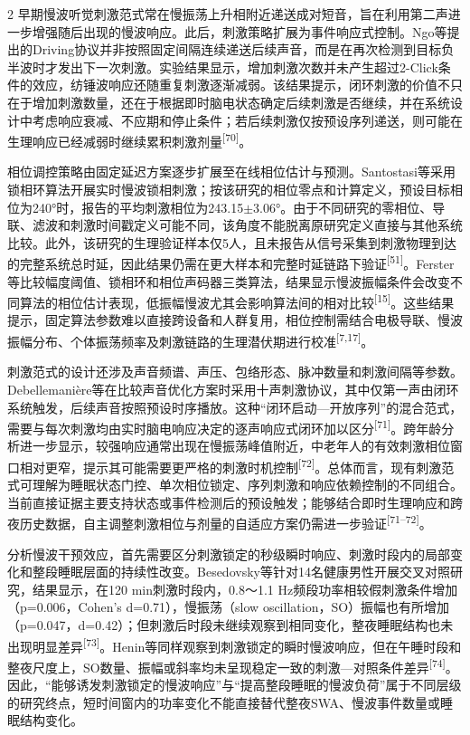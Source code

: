 \documentclass[UTF8,zihao=5,fontset=none]{ctexart}
\newcommand{\hei}{\CJKfamily{hei}}
\newcommand{\leveltwo}[1]{%
  \par\noindent{\hei\fontsize{10pt}{12pt}\selectfont\bfseries #1\par}}
\newcommand{\refcite}[1]{\nolinebreak[4]\textsuperscript{[#1]}}
\begin{document}
\begin{multicols}{2}
早期慢波听觉刺激范式常在慢振荡上升相附近递送成对短音，旨在利用第二声进一步增强随后出现的慢波响应。此后，刺激策略扩展为事件响应式控制。Ngo等提出的Driving协议并非按照固定间隔连续递送后续声音，而是在再次检测到目标负半波时才发出下一次刺激。实验结果显示，增加刺激次数并未产生超过2-Click条件的效应，纺锤波响应还随重复刺激逐渐减弱。该结果提示，闭环刺激的价值不只在于增加刺激数量，还在于根据即时脑电状态确定后续刺激是否继续，并在系统设计中考虑响应衰减、不应期和停止条件；若后续刺激仅按预设序列递送，则可能在生理响应已经减弱时继续累积刺激剂量\refcite{70}。\par

相位调控策略由固定延迟方案逐步扩展至在线相位估计与预测。Santostasi等采用锁相环算法开展实时慢波锁相刺激；按该研究的相位零点和计算定义，预设目标相位为240°时，报告的平均刺激相位为243.15$\pm$3.06°。由于不同研究的零相位、导联、滤波和刺激时间戳定义可能不同，该角度不能脱离原研究定义直接与其他系统比较。此外，该研究的生理验证样本仅5人，且未报告从信号采集到刺激物理到达的完整系统总时延，因此结果仍需在更大样本和完整时延链路下验证\refcite{51}。Ferster等比较幅度阈值、锁相环和相位声码器三类算法，结果显示慢波振幅条件会改变不同算法的相位估计表现，低振幅慢波尤其会影响算法间的相对比较\refcite{15}。这些结果提示，固定算法参数难以直接跨设备和人群复用，相位控制需结合电极导联、慢波振幅分布、个体振荡频率及刺激链路的生理潜伏期进行校准\refcite{7,17}。\par

刺激范式的设计还涉及声音频谱、声压、包络形态、脉冲数量和刺激间隔等参数。Debellemanière等在比较声音优化方案时采用十声刺激协议，其中仅第一声由闭环系统触发，后续声音按照预设时序播放。这种“闭环启动—开放序列”的混合范式，需要与每次刺激均由实时脑电响应决定的逐声响应式闭环加以区分\refcite{71}。跨年龄分析进一步显示，较强响应通常出现在慢振荡峰值附近，中老年人的有效刺激相位窗口相对更窄，提示其可能需要更严格的刺激时机控制\refcite{72}。总体而言，现有刺激范式可理解为睡眠状态门控、单次相位锁定、序列刺激和响应依赖控制的不同组合。当前直接证据主要支持状态或事件检测后的预设触发；能够结合即时生理响应和跨夜历史数据，自主调整刺激相位与剂量的自适应方案仍需进一步验证\refcite{71--72}。\par

\leveltwo{3.2 慢波与纺锤活动调制及其耦合的生理证据}

分析慢波干预效应，首先需要区分刺激锁定的秒级瞬时响应、刺激时段内的局部变化和整段睡眠层面的持续性改变。Besedovsky等针对14名健康男性开展交叉对照研究，结果显示，在120 min刺激时段内，0.8～1.1 Hz频段功率相较假刺激条件增加（p=0.006，Cohen's d=0.71），慢振荡（slow oscillation，SO）振幅也有所增加（p=0.047，d=0.42）；但刺激后时段未继续观察到相同变化，整夜睡眠结构也未出现明显差异\refcite{73}。Henin等同样观察到刺激锁定的瞬时慢波响应，但在午睡时段和整夜尺度上，SO数量、振幅或斜率均未呈现稳定一致的刺激—对照条件差异\refcite{74}。因此，“能够诱发刺激锁定的慢波响应”与“提高整段睡眠的慢波负荷”属于不同层级的研究终点，短时间窗内的功率变化不能直接替代整夜SWA、慢波事件数量或睡眠结构变化。\par


\end{multicols}
\end{document}
